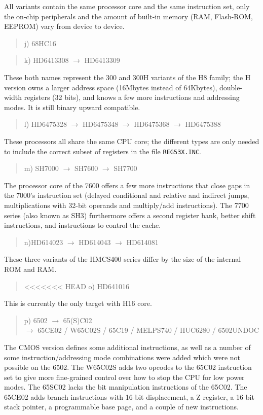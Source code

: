 \documentclass[12pt,twoside]{report}
\newcommand{\tty}[1]{{\tt #1}}
\begin{document}
All variants contain the same processor core and the same
instruction set, only the on-chip peripherals and the
amount of built-in memory (RAM, Flash-ROM, EEPROM)
vary from device to device.
\begin{quote}
j) 68HC16
\end{quote}
\begin{quote}
k) HD6413308 $\rightarrow$ HD6413309
\end{quote}
These both names represent the 300 and 300H variants of the H8
family; the H version owns a larger address space (16Mbytes instead
of 64Kbytes), double-width registers (32 bits), and knows a few more
instructions and addressing modes.  It is still binary upward
compatible.
\begin{quote}
l) HD6475328 $\rightarrow$ HD6475348 $\rightarrow$ HD6475368 $\rightarrow$ HD6475388
\end{quote}
These processors all share the same CPU core; the different types are
only needed to include the correct subset of registers in the file
\tty{REG53X.INC}.
\begin{quote}
m) SH7000 $\rightarrow$ SH7600 $\longrightarrow$ SH7700
\end{quote}
The processor core of the 7600 offers a few more instructions that
close gaps in the 7000's instruction set (delayed conditional and
relative and indirect jumps, multiplications with 32-bit operands and
multiply/add instructions).  The 7700 series (also known as SH3)
furthermore offers a second register bank, better shift instructions, and
instructions to control the cache.
\begin{quote}
n)HD614023 $\longrightarrow$ HD614043 $\longrightarrow$ HD614081
\end{quote}
These three variants of the HMCS400 series differ by the size of
the internal ROM and RAM.
\begin{quote}
<<<<<<< HEAD
o) HD641016
\end{quote}
This is currently the only target with H16 core.
\begin{quote}
p) 6502 $\rightarrow$ 65(S)C02 \\
   $\rightarrow$ 65CE02 / W65C02S / 65C19 / MELPS740 / HUC6280 / 6502UNDOC
\end{quote}
The CMOS version defines some additional instructions, as well as a number of
some instruction/addressing mode combinations were added which were not
possible on the 6502.  The W65C02S adds two opcodes to the 65C02 instruction
set to give more fine-grained control over how to stop the CPU for low power
modes.  The 65SC02 lacks the bit manipulation instructions of the
65C02.  The 65CE02 adds branch instructions with 16-bit displacement, a Z
register, a 16 bit stack pointer, a programmable base page, and a couple of
new instructions.
\end{document}
